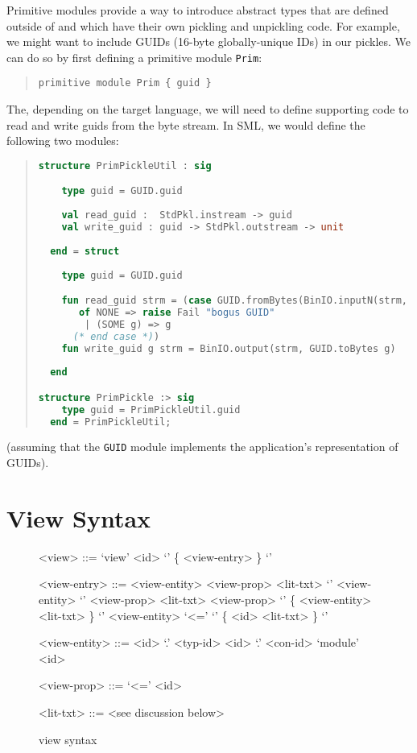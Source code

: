 Primitive modules provide a way to introduce abstract types that are defined outside
of \asdl{} and which have their own pickling and unpickling code.
For example, we might want to include GUIDs (16-byte globally-unique IDs) in our
pickles.
We can do so by first defining a primitive module \lstinline!Prim!:
\begin{quote}\begin{lstlisting}[language=ASDL]
primitive module Prim { guid }
\end{lstlisting}\end{quote}%
The, depending on the target language, we will need to define
supporting code to read and write guids from the byte stream.
In SML, we would define the following two modules:
\begin{quote}\begin{lstlisting}[language=SML]
structure PrimPickleUtil : sig

    type guid = GUID.guid
    
    val read_guid :  StdPkl.instream -> guid
    val write_guid : guid -> StdPkl.outstream -> unit
    
  end = struct
  
    type guid = GUID.guid

    fun read_guid strm = (case GUID.fromBytes(BinIO.inputN(strm, 16))
	   of NONE => raise Fail "bogus GUID"
	    | (SOME g) => g
	  (* end case *))
    fun write_guid g strm = BinIO.output(strm, GUID.toBytes g)
    
  end

structure PrimPickle :> sig
    type guid = PrimPickleUtil.guid
  end = PrimPickleUtil;
\end{lstlisting}\end{quote}%
(assuming that the \lstinline!GUID! module implements the application's representation
of GUIDs).

\section{View Syntax}
\begin{figure}[ht]
  \begin{center}
    \begin{grammar}

      <view>        ::= `view' <id> `{' \{ <view-entry> \} `}'

      <view-entry>  ::= <view-entity>  <view-prop> <lit-txt>
		 \alt{} `{' {<view-entity>} `}' <view-prop> <lit-txt>
		 \alt{} <view-prop> `{' \{ <view-entity> <lit-txt> \} `}'
		 \alt{} <view-entity> `<=' `{' \{ <id> <lit-txt> \} `}'

      <view-entity> ::= <id> `.' <typ-id>
		  `.' <con-id>
		 \alt{} `module' <id>

      <view-prop>   ::= `<='  <id>

      <lit-txt>     ::= <see discussion below>
    \end{grammar}
  \end{center}
  \caption{\asdl{} view syntax}
\end{figure}%

